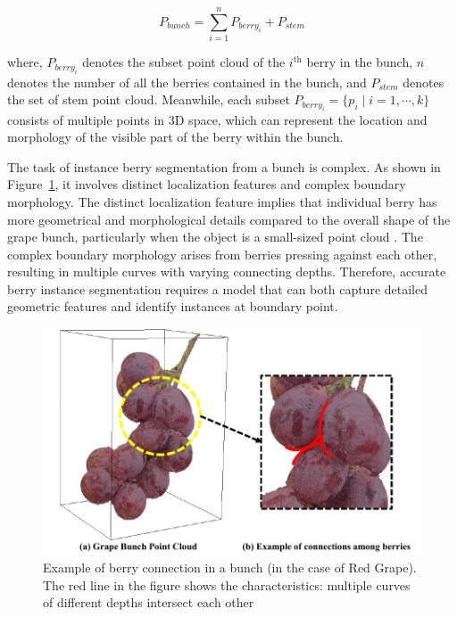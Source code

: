 \documentclass[12pt]{article}
\begin{document}
\begin{equation}
P_{bunch} = \sum_{i=1}^{n} P_{berry_{i}} + P_{stem}
\label{eq:1}
\end{equation}

{\raggedright where, $P_{berry_{i}}$ denotes the subset point cloud of the $i^{\text{th}}$ berry in the bunch, $n$ denotes the number of all the berries contained in the bunch, and $P_{stem}$ denotes the set of stem point cloud. 
Meanwhile, each subset $P_{berry_{i}}=\{p_i \mid i=1, \cdots, k\}$ consists of multiple points in 3D space, which can represent the location and morphology of the visible part of the berry within the bunch.}

The task of instance berry segmentation from a bunch is complex. 
As shown in Figure~\ref{fig:raw2}, it involves distinct localization features and complex boundary morphology. 
The distinct localization feature implies that individual berry has more geometrical and morphological details compared to the overall shape of the grape bunch, particularly when the object is a small-sized point cloud \citep{luo_infield_2022}. 
The complex boundary morphology arises from berries pressing against each other, resulting in multiple curves with varying connecting depths. 
Therefore, accurate berry instance segmentation requires a model that can both capture detailed geometric features and identify instances at boundary point. 

\begin{figure}[hbt!]
    \centering
    \includegraphics[width=1\textwidth]{figures/Figure5.pdf}
    \caption{Example of berry connection in a bunch (in the case of Red Grape). The red line in the figure shows the characteristics: multiple curves of different depths intersect each other}
    \label{fig:raw2}
\end{figure}
\end{document}
